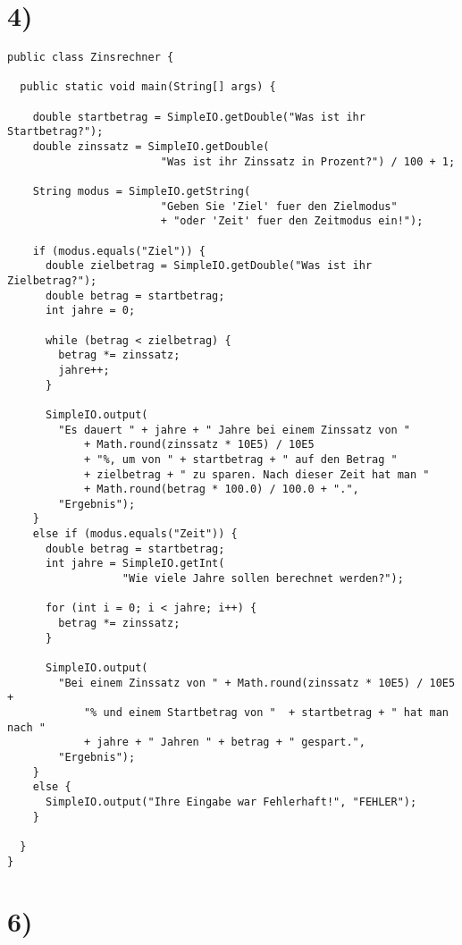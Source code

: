 \documentclass[12pt]{article}
\begin{document}
\section{4)}
\begin{lstlisting}
public class Zinsrechner {

  public static void main(String[] args) {
  
    double startbetrag = SimpleIO.getDouble("Was ist ihr Startbetrag?");
    double zinssatz = SimpleIO.getDouble(
                        "Was ist ihr Zinssatz in Prozent?") / 100 + 1;
                        
    String modus = SimpleIO.getString(
                        "Geben Sie 'Ziel' fuer den Zielmodus"
                        + "oder 'Zeit' fuer den Zeitmodus ein!");

    if (modus.equals("Ziel")) {
      double zielbetrag = SimpleIO.getDouble("Was ist ihr Zielbetrag?");
      double betrag = startbetrag;
      int jahre = 0;
      
      while (betrag < zielbetrag) {
        betrag *= zinssatz;
        jahre++;
      }
      
      SimpleIO.output(
        "Es dauert " + jahre + " Jahre bei einem Zinssatz von " 
            + Math.round(zinssatz * 10E5) / 10E5
            + "%, um von " + startbetrag + " auf den Betrag "
            + zielbetrag + " zu sparen. Nach dieser Zeit hat man "
            + Math.round(betrag * 100.0) / 100.0 + ".",
        "Ergebnis");
    }
    else if (modus.equals("Zeit")) {
      double betrag = startbetrag;
      int jahre = SimpleIO.getInt(
                  "Wie viele Jahre sollen berechnet werden?");
      
      for (int i = 0; i < jahre; i++) {
        betrag *= zinssatz;
      }
      
      SimpleIO.output(
        "Bei einem Zinssatz von " + Math.round(zinssatz * 10E5) / 10E5 + 
            "% und einem Startbetrag von "  + startbetrag + " hat man nach "
            + jahre + " Jahren " + betrag + " gespart.",
        "Ergebnis");
    }
    else {
      SimpleIO.output("Ihre Eingabe war Fehlerhaft!", "FEHLER");
    }
    
  }
}
\end{lstlisting}
\pagebreak

\section{6)}
\end{document}
